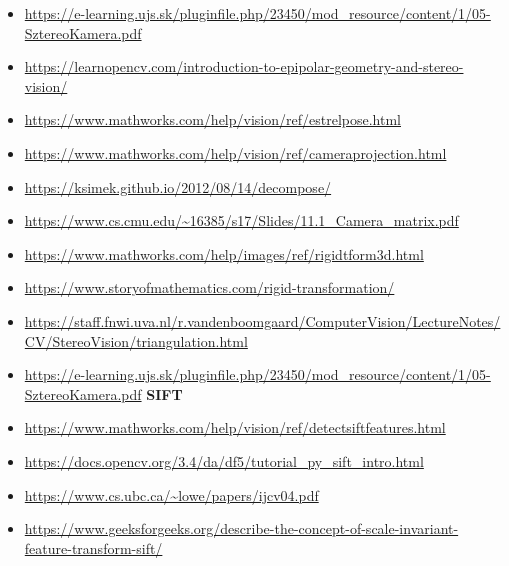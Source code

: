\documentclass[12pt]{report}
\begin{document}
\begin{itemize}
            \item \url{https://e-learning.ujs.sk/pluginfile.php/23450/mod_resource/content/1/05-SztereoKamera.pdf}
            \item \url{https://learnopencv.com/introduction-to-epipolar-geometry-and-stereo-vision/}
            \item \url{https://www.mathworks.com/help/vision/ref/estrelpose.html}
            \item \url{https://www.mathworks.com/help/vision/ref/cameraprojection.html}
            \item \url{https://ksimek.github.io/2012/08/14/decompose/}
            \item \url{https://www.cs.cmu.edu/~16385/s17/Slides/11.1_Camera_matrix.pdf}
            \item \url{https://www.mathworks.com/help/images/ref/rigidtform3d.html}
            \item \url{https://www.storyofmathematics.com/rigid-transformation/}
            \item \url{https://staff.fnwi.uva.nl/r.vandenboomgaard/ComputerVision/LectureNotes/CV/StereoVision/triangulation.html}
            \item \url{https://e-learning.ujs.sk/pluginfile.php/23450/mod_resource/content/1/05-SztereoKamera.pdf}
        \textbf{SIFT}
            \item \url{https://www.mathworks.com/help/vision/ref/detectsiftfeatures.html}
            \item \url{https://docs.opencv.org/3.4/da/df5/tutorial_py_sift_intro.html}
            \item \url{https://www.cs.ubc.ca/~lowe/papers/ijcv04.pdf}
            \item \url{https://www.geeksforgeeks.org/describe-the-concept-of-scale-invariant-feature-transform-sift/}
        \end{itemize}
\end{document}
